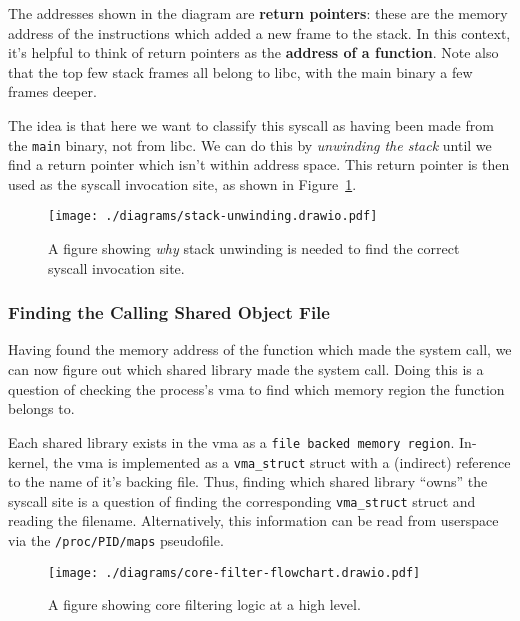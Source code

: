 The addresses shown in the diagram are \textbf{return pointers}: these are the
memory address of the instructions which added a new frame to the stack. In this
context, it's helpful to think of return pointers as the \textbf{address of a
function}. Note also that the top few stack frames all belong to \ac{libc}, with
the main binary a few frames deeper.

The idea is that here we want to classify this syscall as having been made from
the \texttt{main} binary, not from \ac{libc}. We can do this by
\textit{unwinding the stack} until we find a return pointer which isn't within
 address space. This return pointer is then used as the syscall
invocation site, as shown in Figure~\ref{fig:stack-unwinding}.

\begin{figure}[ht]
    \centering
    \texttt{[image: ./diagrams/stack-unwinding.drawio.pdf]} 
    \caption{A figure showing \textit{why} stack unwinding is needed to find the
    correct syscall invocation site.}
    \label{fig:stack-unwinding}
\end{figure}

\subsubsection{Finding the Calling Shared Object File}\label{subsubsec:find_so}

Having found the memory address of the function which made the system call, we
can now figure out which shared library made the system call. Doing this is a
question of checking the process's \ac{vma} to find which memory region the
function belongs to. 

Each shared library exists in the \ac{vma} as a \texttt{file backed memory region}.
In-kernel, the \ac{vma} is implemented as a \texttt{vma\_struct} struct with a
(indirect) reference to the name of it's backing file. Thus, finding which
shared library ``owns'' the syscall site is a question of finding the
corresponding \texttt{vma\_struct} struct and reading the filename.
Alternatively, this information can be read from userspace via the
\texttt{/proc/PID/maps} pseudofile.

\begin{figure}[htbp]
    \centering
    \texttt{[image: ./diagrams/core-filter-flowchart.drawio.pdf]}
    \caption{A figure showing \afg core filtering logic at a high level.}
    \label{fig:core-filter-flowchart}
\end{figure}


